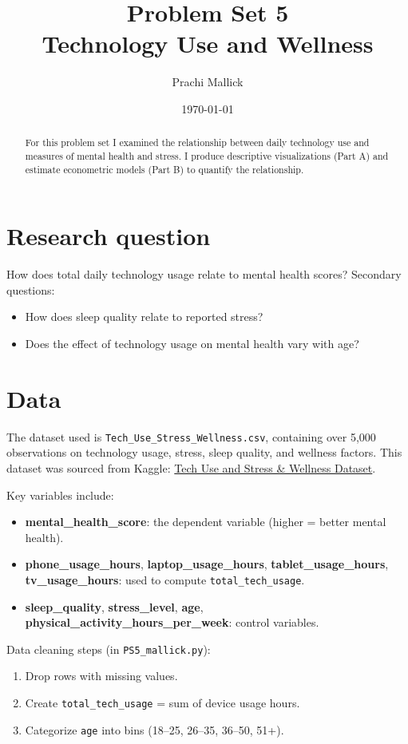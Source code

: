 \documentclass[11pt]{article}
\title{Problem Set 5 \\ Technology Use and Wellness}
\author{Prachi Mallick}
\date{\today}
\begin{document}
\maketitle

\begin{abstract}
For this problem set  I examined the relationship between daily technology use and measures of mental health and stress.
I produce descriptive visualizations (Part A) and estimate econometric models (Part B) to quantify the relationship.
\end{abstract}

\section*{Research question}
How does total daily technology usage relate to mental health scores?  Secondary questions:
\begin{itemize}
  \item How does sleep quality relate to reported stress?
  \item Does the effect of technology usage on mental health vary with age?
\end{itemize}

\section*{Data}
The dataset used is \texttt{Tech\_Use\_Stress\_Wellness.csv}, containing over 5,000 observations on technology usage, stress, sleep quality, and wellness factors.  
This dataset was sourced from Kaggle:  
\href{https://www.kaggle.com/datasets/nagpalprabhavalkar/tech-use-and-stress-wellness}{Tech Use and Stress \& Wellness Dataset}.

Key variables include:
\begin{itemize}
  \item \textbf{mental\_health\_score}: the dependent variable (higher = better mental health).
  \item \textbf{phone\_usage\_hours}, \textbf{laptop\_usage\_hours}, \textbf{tablet\_usage\_hours}, \textbf{tv\_usage\_hours}: used to compute \texttt{total\_tech\_usage}.
  \item \textbf{sleep\_quality}, \textbf{stress\_level}, \textbf{age}, \textbf{physical\_activity\_hours\_per\_week}: control variables.
\end{itemize}
Data cleaning steps (in \texttt{PS5\_mallick.py}):
\begin{enumerate}
  \item Drop rows with missing values.
  \item Create \texttt{total\_tech\_usage} = sum of device usage hours.
  \item Categorize \texttt{age} into bins (18–25, 26–35, 36–50, 51+).
\end{enumerate}
\end{document}
